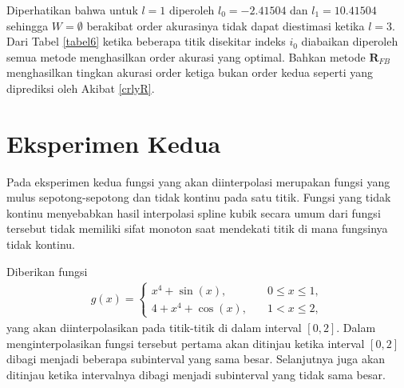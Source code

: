 \begin{table}[htp]
        \centering
        \caption{Tabel estimasi order akurasi eksperimen pertama dengan interval tidak sama besar $\hat{h}=\frac{3}{4}2^{-l}$, $l \in \{3,5,7,9\}$, $W = \{ i : 1 \leq i \leq l_0 \text{ atau } l_1 \leq i \leq 2^{l+2} - 1 \}$, $l_0 = (2^{l+1} - 1) + \log_2(\frac{3}{4} 2^{-l})$ dan $l_1 = (2^{l+1} + 1) - \log_2(\frac{3}{4} 2^{-l})$}
        \label{tabel6}
    \end{table}

Diperhatikan bahwa untuk $l = 1$ diperoleh $l_0 = -2.41504$ dan $l_1 = 10.41504$ sehingga $W = \emptyset$ berakibat order akurasinya tidak dapat diestimasi ketika $l = 3$. Dari Tabel \ref{tabel6} ketika beberapa titik disekitar indeks $i_0$ diabaikan diperoleh semua metode menghasilkan order akurasi yang optimal. Bahkan metode $\textbf{R}_{FB}$ menghasilkan tingkan akurasi order ketiga bukan order kedua seperti yang diprediksi oleh Akibat \ref{crlyR}.

\section{Eksperimen Kedua}

Pada eksperimen kedua fungsi yang akan diinterpolasi merupakan fungsi yang mulus sepotong-sepotong dan tidak kontinu pada satu titik. Fungsi yang tidak kontinu menyebabkan hasil interpolasi spline kubik secara umum dari fungsi tersebut tidak memiliki sifat monoton saat mendekati titik di mana fungsinya tidak kontinu.

Diberikan fungsi
\begin{align*}
    g(x) = \begin{cases}
    x^4 + \sin(x), \quad & 0\leq x \leq 1,\\
    4 + x^4 + \cos(x), \quad & 1 < x \leq 2,
    \end{cases}
\end{align*}
yang akan diinterpolasikan pada titik-titik di dalam interval $[0,2]$. Dalam menginterpolasikan fungsi tersebut pertama akan ditinjau ketika interval $[0,2]$ dibagi menjadi beberapa subinterval yang sama besar. Selanjutnya juga akan ditinjau ketika intervalnya dibagi menjadi subinterval yang tidak sama besar. 

